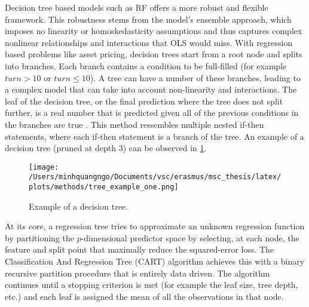 Decision tree based models such as RF offers a more robust and flexible framework. This robustness stems from the model's ensemble approach, which imposes no linearity or homoskedasticity assumptions and thus captures complex nonlinear relationships and interactions that OLS would miss. With regression based problems like asset pricing, decision trees start from a root node and splits into branches. Each branch contains a condition to be full-filled (for example $turn > 10$ or $turn \leq 10$). A tree can have a number of these branches, leading to a complex model that can take into account non-linearity and interactions. The leaf of the decision tree, or the final prediction where the tree does not split further, is a real number that is predicted given all of the previous conditions in the branches are true \cite{cutler_2012}. This method ressembles multiple nested if-then statements, where each if-then statement is a branch of the tree. An example of a decision tree (pruned at depth 3) can be observed in \cref{fig:decision_tree_viz}.

\begin{figure}[H]
    \centering
    \texttt{[image: /Users/minhquangngo/Documents/vsc/erasmus/msc\_thesis/latex/plots/methods/tree\_example\_one.png]}
    \caption{Example of a decision tree.}
    \label{fig:decision_tree_viz}
\end{figure}

At its core, a regression tree tries to approximate an unknown regression function by partitioning the $p$-dimensional predictor space  by selecting, at each node, the feature and split point that maximally reduce the squared-error loss. The Classification And Regression Tree (CART) algorithm achieves this with a binary recursive partition procedure that is entirely data driven. The algorithm continues until a stopping criterion is met (for example the leaf size, tree depth, etc.) and each leaf is assigned the mean of all the observations in that node.

    
    
        
